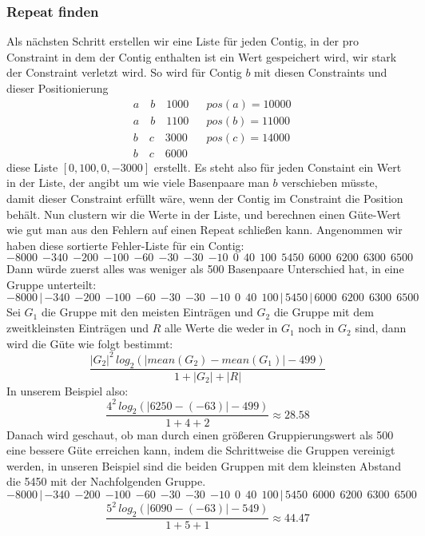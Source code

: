 \documentclass[12pt,ngerman,titlepage,a4paper]{article}
\begin{document}
\subsubsection*{Repeat finden} 
Als nächsten Schritt erstellen wir eine Liste für jeden Contig, in der pro Constraint in dem der Contig enthalten ist ein Wert gespeichert wird, wir stark der Constraint verletzt wird. So wird für Contig $b$ mit diesen Constraints und dieser Positionierung
\begin{align*}
&a \quad b \quad 1000 &&pos(a) = 10000\\
&a \quad b \quad 1100 &&pos(b) = 11000\\
&b \quad c \quad 3000 &&pos(c) = 14000\\
&b \quad c \quad 6000
\end{align*}
diese Liste $[0, 100, 0, -3000]$ erstellt. Es steht also für jeden Constaint ein Wert in der Liste, der angibt um wie viele Basenpaare man $b$ verschieben müsste, damit dieser Constraint erfüllt wäre, wenn der Contig im Constraint die Position behält.
Nun clustern wir die Werte in der Liste, und berechnen einen Güte-Wert wie gut man aus den Fehlern auf einen Repeat schließen kann.
Angenommen wir haben diese sortierte Fehler-Liste für ein Contig:
{\footnotesize \[ {-8000} \ \ {-340} \ \ {-200} \ \ {-100} \ \ {-60} \ \ {-30} \ \ {-30} \ \ {-10} \ \ 0 \ \ 40 \ \ 100 \ \ 5450 \ \ 6000 \ \ 6200 \ \ 6300 \ \ 6500\]}
Dann würde zuerst alles was weniger als 500 Basenpaare Unterschied hat, in eine Gruppe unterteilt:
{\footnotesize \[ {-8000} \, | \, {-340} \ \ {-200} \ \ {-100} \ \ {-60} \ \ {-30} \ \ {-30} \ \ {-10} \ \ 0 \ \ 40 \ \ 100 \, | \, 5450 \,| \, 6000 \ \ 6200 \ \ 6300 \ \ 6500\]}
Sei $G_1$ die Gruppe mit den meisten Einträgen und $G_2$ die Gruppe mit dem zweitkleinsten Einträgen und $R$ alle Werte die weder in $G_1$ noch in $G_2$ sind, dann wird die Güte wie folgt bestimmt:
\[\frac{|G_2|^2 \, log_2( |mean(G_2) - mean(G_1)| - 499 )}{1 + |G_2| + |R| }\]
In unserem Beispiel also:
\[\frac{4^2 \, log_2( |6250 - (-63)| - 499 )}{1 + 4 + 2 } \approx 28.58\]
Danach wird geschaut, ob man durch einen größeren Gruppierungswert als 500 eine bessere Güte erreichen kann, indem die Schrittweise die Gruppen vereinigt werden, in unseren Beispiel sind die beiden Gruppen mit dem kleinsten Abstand die 5450 mit der Nachfolgenden Gruppe.
{\footnotesize \[ {-8000} \, | \, {-340} \ \ {-200} \ \ {-100} \ \ {-60} \ \ {-30} \ \ {-30} \ \ {-10} \ \ 0 \ \ 40 \ \ 100 \, | \, 5450 \ \ 6000 \ \ 6200 \ \ 6300 \ \ 6500\]}
\[\frac{5^2 \, log_2( |6090 - (-63)| - 549 )}{1 + 5 + 1 } \approx 44.47\]
\end{document}
